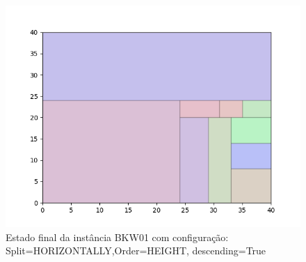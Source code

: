 \begin{figure}[H]
    \centering
    \caption[]{Estado final da instância BKW01 com configuração: Split=HORIZONTALLY,Order=HEIGHT, descending=True}
    \label{fig:bkw01-horizontally-height-true}
    \includegraphics[scale=0.5]{output/figures/bkw/bkw01/horizontally/height/true/00}
\end{figure}